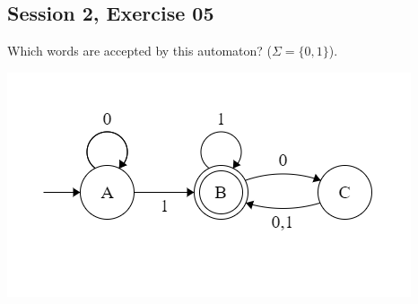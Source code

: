 \subsection{Session 2, Exercise 05}


Which words are accepted by this automaton? ($\Sigma=\{0,1\}$).

\includegraphics[width=0.5\linewidth]{02/2_5_automaton.png}

